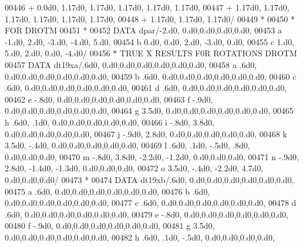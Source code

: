 \begin{DoxyCode}
00446      +                  0.0d0, 1.17d0, 1.17d0, 1.17d0, 1.17d0, 1.17d0,
00447      +                  1.17d0, 1.17d0, 1.17d0, 1.17d0, 1.17d0, 1.17d0,
00448      +                  1.17d0, 1.17d0, 1.17d0/
00449 \textcolor{comment}{*}
00450 \textcolor{comment}{*                         FOR DROTM}
00451 \textcolor{comment}{*}
00452       \textcolor{keyword}{DATA} dpar/-2.d0,  0.d0,0.d0,0.d0,0.d0,
00453      a          -1.d0,  2.d0, -3.d0, -4.d0,  5.d0,
00454      b           0.d0,  0.d0,  2.d0, -3.d0,  0.d0,
00455      c           1.d0,  5.d0,  2.d0,  0.d0, -4.d0/
00456 \textcolor{comment}{*                        TRUE X RESULTS F0R ROTATIONS DROTM}
00457       \textcolor{keyword}{DATA} dt19xa/.6d0,                  0.d0,0.d0,0.d0,0.d0,0.d0,0.d0,
00458      a            .6d0,                  0.d0,0.d0,0.d0,0.d0,0.d0,0.d0,
00459      b            .6d0,                  0.d0,0.d0,0.d0,0.d0,0.d0,0.d0,
00460      c            .6d0,                  0.d0,0.d0,0.d0,0.d0,0.d0,0.d0,
00461      d            .6d0,                  0.d0,0.d0,0.d0,0.d0,0.d0,0.d0,
00462      e           -.8d0,                  0.d0,0.d0,0.d0,0.d0,0.d0,0.d0,
00463      f           -.9d0,                  0.d0,0.d0,0.d0,0.d0,0.d0,0.d0,
00464      g           3.5d0,                  0.d0,0.d0,0.d0,0.d0,0.d0,0.d0,
00465      h            .6d0,   .1d0,             0.d0,0.d0,0.d0,0.d0,0.d0,
00466      i           -.8d0,  3.8d0,             0.d0,0.d0,0.d0,0.d0,0.d0,
00467      j           -.9d0,  2.8d0,             0.d0,0.d0,0.d0,0.d0,0.d0,
00468      k           3.5d0,  -.4d0,             0.d0,0.d0,0.d0,0.d0,0.d0,
00469      l            .6d0,   .1d0,  -.5d0,   .8d0,          0.d0,0.d0,0.d0,
00470      m           -.8d0,  3.8d0, -2.2d0, -1.2d0,          0.d0,0.d0,0.d0,
00471      n           -.9d0,  2.8d0, -1.4d0, -1.3d0,          0.d0,0.d0,0.d0,
00472      o           3.5d0,  -.4d0, -2.2d0,  4.7d0,          0.d0,0.d0,0.d0/
00473 \textcolor{comment}{*}
00474       \textcolor{keyword}{DATA} dt19xb/.6d0,                  0.d0,0.d0,0.d0,0.d0,0.d0,0.d0,
00475      a            .6d0,                  0.d0,0.d0,0.d0,0.d0,0.d0,0.d0,
00476      b            .6d0,                  0.d0,0.d0,0.d0,0.d0,0.d0,0.d0,
00477      c            .6d0,                  0.d0,0.d0,0.d0,0.d0,0.d0,0.d0,
00478      d            .6d0,                  0.d0,0.d0,0.d0,0.d0,0.d0,0.d0,
00479      e           -.8d0,                  0.d0,0.d0,0.d0,0.d0,0.d0,0.d0,
00480      f           -.9d0,                  0.d0,0.d0,0.d0,0.d0,0.d0,0.d0,
00481      g           3.5d0,                  0.d0,0.d0,0.d0,0.d0,0.d0,0.d0,
00482      h            .6d0,   .1d0,  -.5d0,             0.d0,0.d0,0.d0,0.d0,

\end{DoxyCode}
